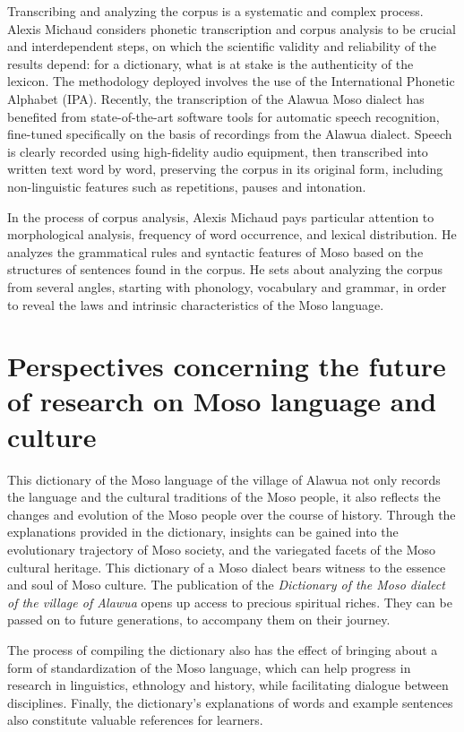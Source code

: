 Transcribing and analyzing the corpus is a systematic and complex process. Alexis Michaud considers phonetic transcription and corpus analysis to be crucial and interdependent steps, on which the scientific validity and reliability of the results depend: for a dictionary, what is at stake is the authenticity of the lexicon. The methodology deployed involves the use of the International Phonetic Alphabet (IPA). Recently, the transcription of the Alawua Moso dialect has benefited from state-of-the-art software tools for automatic speech recognition, fine-tuned specifically on the basis of recordings from the Alawua dialect. Speech is clearly recorded using high-fidelity audio equipment, then transcribed into written text word by word, preserving the corpus in its original form, including non-linguistic features such as repetitions, pauses and intonation.

In the process of corpus analysis, Alexis Michaud pays particular attention to morphological analysis, frequency of word occurrence, and lexical distribution. He analyzes the grammatical rules and syntactic features of Moso based on the structures of sentences found in the corpus. He sets about analyzing the corpus from several angles, starting with phonology, vocabulary and grammar, in order to reveal the laws and intrinsic characteristics of the Moso language.

\section*{Perspectives concerning the future of research on Moso language and culture}

This dictionary of the Moso language of the village of Alawua not only records the language and the cultural traditions of the Moso people, it also reflects the changes and evolution of the Moso people over the course of history. Through the explanations provided in the dictionary, insights can be gained into the evolutionary trajectory of Moso society, and the variegated facets of the Moso cultural heritage. This dictionary of a Moso dialect bears witness to the essence and soul of Moso culture. The publication of the \emph{Dictionary of the Moso dialect of the village of Alawua} opens up access to precious spiritual riches. They can be passed on to future generations, to accompany them on their journey.

The process of compiling the dictionary also has the effect of bringing about a form of standardization of the Moso language, which can help progress in research in linguistics, ethnology and history, while facilitating dialogue between disciplines. Finally, the dictionary's explanations of words and example sentences also constitute valuable references for learners.

